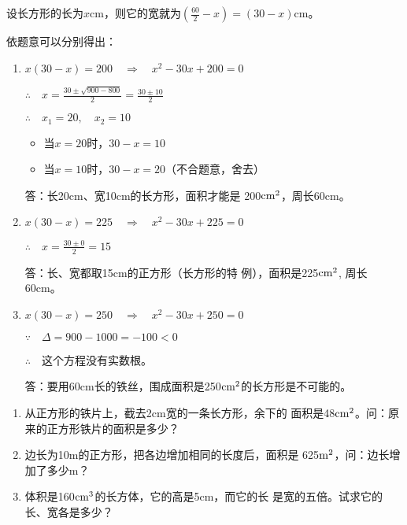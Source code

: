 \begin{figure}[htp]
    \centering
    \caption{}
\end{figure}

\begin{solution}
    设长方形的长为$x$cm，则它的宽就为$\left(\frac{60}{2}-x\right)=(30-x)$cm。

    依题意可以分别得出：
\begin{enumerate}
    \item $x(30-x)=200\quad \Rightarrow\quad x^2-30x+200=0$

    $\therefore\quad x=\frac{30\pm \sqrt{900-800}}{2}=\frac{30\pm 10}{2}$

    $\therefore\quad x_1=20,\quad x_2=10$
\begin{itemize}
    \item 当$x=20$时，$30-x=10$
    \item 当$x=10$时，$30-x=20$（不合题意，舍去）
\end{itemize}

答：长20cm、宽10cm的长方形，面积才能是
200${\rm cm}^2$，周长60cm。

\item $x(30-x)=225\quad \Rightarrow\quad x^2-30x+225=0$

$\therefore\quad x=\frac{30\pm 0}{2}=15$

答：长、宽都取15cm的正方形（长方形的特
例），面积是225${\rm cm}^2$, 周长60cm。

\item $x(30-x)=250\quad \Rightarrow\quad x^2-30x+250=0$

$\because\quad \Delta =900-1000=-100<0$

$\therefore\quad $这个方程没有实数根。

答：要用60cm长的铁丝，围成面积是250${\rm cm}^2$的长方形是不可能的。
\end{enumerate}
\end{solution}

\begin{ex}
\begin{enumerate}
    \item 从正方形的铁片上，截去2cm宽的一条长方形，余下的
    面积是48${\rm cm}^2$。问：原来的正方形铁片的面积是多少？

    \item 边长为10m的正方形，把各边增加相同的长度后，面积是
625${\rm m}^2$，问：边长增加了多少m？
\item 体积是160${\rm cm}^3$的长方体，它的高是5cm，而它的长
是宽的五倍。试求它的长、宽各是多少？
\end{enumerate}
    
\end{ex}



